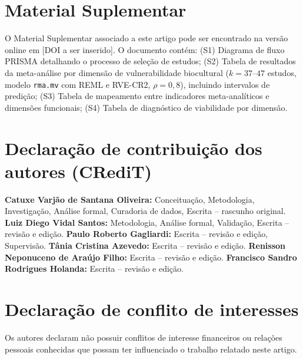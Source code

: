 \section*{Material Suplementar}

O Material Suplementar associado a este artigo pode ser encontrado na versão online em [DOI a ser inserido]. O documento contém: (S1) Diagrama de fluxo PRISMA detalhando o processo de seleção de estudos; (S2) Tabela de resultados da meta-análise por dimensão de vulnerabilidade biocultural ($k = 37$--$47$ estudos, modelo \texttt{rma.mv} com REML e RVE-CR2, $\rho = 0{,}8$), incluindo intervalos de predição; (S3) Tabela de mapeamento entre indicadores meta-analíticos e dimensões funcionais; (S4) Tabela de diagnóstico de viabilidade por dimensão.


\section*{Declaração de contribuição dos autores (CRediT)}

\textbf{Catuxe Varjão de Santana Oliveira:} Conceituação, Metodologia, Investigação, Análise formal, Curadoria de dados, Escrita -- rascunho original.
\textbf{Luiz Diego Vidal Santos:} Metodologia, Análise formal, Validação, Escrita -- revisão e edição.
\textbf{Paulo Roberto Gagliardi:} Escrita -- revisão e edição, Supervisão.
\textbf{Tânia Cristina Azevedo:} Escrita -- revisão e edição.
\textbf{Renisson Neponuceno de Araújo Filho:} Escrita -- revisão e edição.
\textbf{Francisco Sandro Rodrigues Holanda:} Escrita -- revisão e edição.


\section*{Declaração de conflito de interesses}

Os autores declaram não possuir conflitos de interesse financeiros ou relações pessoais conhecidas que possam ter influenciado o trabalho relatado neste artigo.


